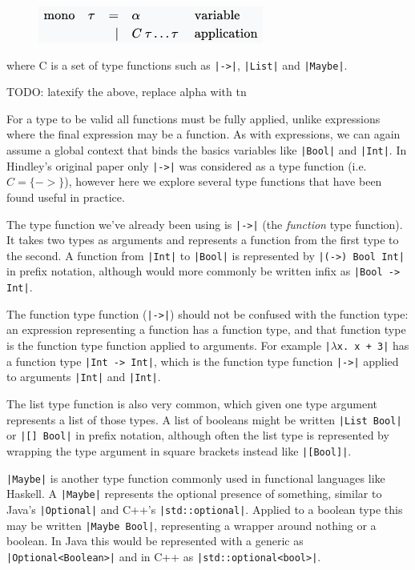 \documentclass[a4paper,fleqn,12pt]{article}
\begin{document}
\begin{figure}[h!]
  \centering
  \includegraphics[width=0.467\linewidth]{images/image1.png}
\end{figure}
where C is a set of type functions such as \texttt{|->|}, \texttt{|List|} and \texttt{|Maybe|}.

TODO: latexify the above, replace alpha with tn

For a type to be valid all functions must be fully applied, unlike expressions where the final expression may be a function.  As with expressions, we can again assume a global context that binds the basics variables like \texttt{|Bool|} and \texttt{|Int|}. In Hindley’s original paper only \texttt{|->|} was considered as a type function (i.e. $C = \{ -> \}$), however here we explore several type functions that have been found useful in practice.

The type function we’ve already been using is \texttt{|->|} (the \textit{function} type function). It takes two types as arguments and represents a function from the first type to the second. A function from \texttt{|Int|} to \texttt{|Bool|} is represented by \texttt{|(->) Bool Int|} in prefix notation, although would more commonly be written infix as \texttt{|Bool -> Int|}.

The function type function (\texttt{|->|}) should not be confused with the function type: an expression representing a function has a function type, and that function type is the function type function applied to arguments. For example \texttt{|$\lambda$x. x + 3|} has a function type \texttt{|Int -> Int|}, which is the function type function \texttt{|->|} applied to arguments \texttt{|Int|} and \texttt{|Int|}.

The list type function is also very common, which given one type argument represents a list of those types. A list of booleans might be written \texttt{|List Bool|} or \texttt{|[] Bool|} in prefix notation, although often the list type is represented by wrapping the type argument in square brackets instead like \texttt{|[Bool]|}.

\texttt{|Maybe|} is another type function commonly used in functional languages like Haskell. A \texttt{|Maybe|} represents the optional presence of something, similar to Java’s \texttt{|Optional|} and C++’s \texttt{|std::optional|}. Applied to a boolean type this may be written \texttt{|Maybe Bool|}, representing a wrapper around nothing or a boolean. In Java this would be represented with a generic as \texttt{|Optional<Boolean>|} and in C++ as \texttt{|std::optional<bool>|}.
\end{document}
